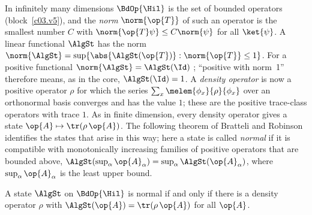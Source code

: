 \begin{vertiefung}[id=c04.v1,
    titel={States in infinitely many dimensions},
    wozu={In the core the positive normalised functionals are exactly the density operators
      (Proposition~\ref{c04.prop.funktionale}). P2 demands $\tr(\rho) = 1$; in infinitely many
      dimensions that presupposes the trace class, and there are states that come from no density
      operator. This block identifies the states represented by density operators and gives a
      state that is not represented by one.},
    voraussetzung={Section~\ref{c04.s1.1}; blocks~\ref{c03.v1} and~\ref{c03.v5} (bounded
      operators). The core does not need this block.},
    zurueck={The density operators are the normal states. In finite dimension these are all
      states; in infinitely many dimensions there are others, and the course does not use them.}]
  In infinitely many dimensions $\BdOp{\Hil}$ is the set of bounded operators
  (block~\ref{c03.v5}), and the \emph{norm} $\norm{\op{T}}$ of such an operator is the smallest
  number $C$ with $\norm{\op{T}\psi} \leq C\norm{\psi}$ for all $\ket{\psi}$. A linear functional
  $\AlgSt$ has the norm $\norm{\AlgSt} = \sup\{\abs{\AlgSt(\op{T})} : \norm{\op{T}} \leq 1\}$.
  For a positive functional $\norm{\AlgSt} = \AlgSt(\Id)$ ;
  ``positive with norm~1'' therefore means, as in the core, $\AlgSt(\Id) = 1$. A
  \emph{density operator} is now a positive operator $\rho$ for which the series
  $\sum_x \melem{\phi_x}{\rho}{\phi_x}$ over an orthonormal basis converges and has the value $1$;
  these are the positive trace-class operators with trace $1$. As in finite dimension, every
  density operator gives a state $\op{A} \mapsto \tr(\rho\,\op{A})$. The following theorem of
  Bratteli and Robinson identifies the states that arise in this way; here a state is called
  \emph{normal} if it is compatible with monotonically increasing families of positive operators
  that are bounded above, $\AlgSt(\sup_\alpha \op{A}_\alpha) = \sup_\alpha \AlgSt(\op{A}_\alpha)$,
  where $\sup_\alpha \op{A}_\alpha$ is the least upper bound.

  \begin{theorem}\label{c04.thm.normal}
    A state $\AlgSt$ on $\BdOp{\Hil}$ is normal if and only if there is a density operator $\rho$
    with $\AlgSt(\op{A}) = \tr(\rho\,\op{A})$ for all $\op{A}$.
  \end{theorem}


\end{vertiefung}
